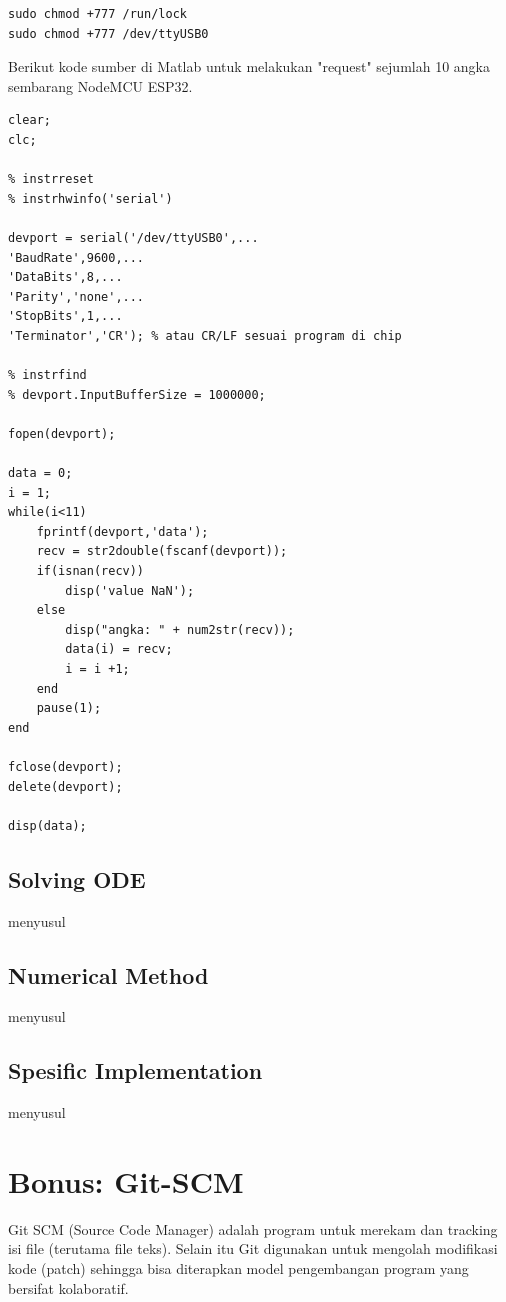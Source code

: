 \documentclass[12pt]{book}
\begin{document}
	\begin{verbatim}
sudo chmod +777 /run/lock
sudo chmod +777 /dev/ttyUSB0
	\end{verbatim}

	Berikut kode sumber di Matlab untuk melakukan "request" sejumlah 10 angka sembarang NodeMCU ESP32.

	\begin{verbatim}
clear;
clc;

% instrreset
% instrhwinfo('serial')

devport = serial('/dev/ttyUSB0',...
'BaudRate',9600,...
'DataBits',8,...
'Parity','none',...
'StopBits',1,...
'Terminator','CR'); % atau CR/LF sesuai program di chip

% instrfind
% devport.InputBufferSize = 1000000;

fopen(devport);

data = 0;
i = 1;
while(i<11)
	fprintf(devport,'data');
	recv = str2double(fscanf(devport));
	if(isnan(recv))
		disp('value NaN');
	else
		disp("angka: " + num2str(recv));
		data(i) = recv;
		i = i +1;
	end
	pause(1);
end

fclose(devport);
delete(devport);

disp(data);
	\end{verbatim}

	\newpage
	\section{Solving ODE}

	menyusul

	\section{Numerical Method}

	menyusul

	\section{Spesific Implementation}

	menyusul

	\chapter{Bonus: Git-SCM}

	Git SCM (Source Code Manager) adalah program untuk merekam dan tracking isi file (terutama file teks).
	Selain itu Git digunakan untuk mengolah modifikasi kode (patch) sehingga bisa diterapkan
	model pengembangan program yang bersifat kolaboratif.\\
\end{document}
